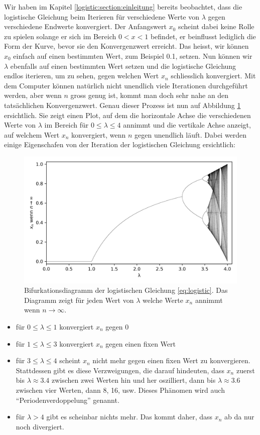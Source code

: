 Wir haben im Kapitel 
\ref{logistic:section:einleitung} 
bereits beobachtet,
dass die logistische Gleichung beim Iterieren für 
verschiedene Werte von $\lambda$ gegen verschiedene 
Endwerte konvergiert. 
Der Anfangswert $x_0$ scheint dabei keine Rolle zu spielen
solange er sich im Bereich $0 < x < 1$ befindet, 
er beinflusst lediglich die Form der Kurve, 
bevor sie den Konvergenzwert erreicht. 
Das heisst, wir können $x_0$ einfach auf einen bestimmten Wert, 
zum Beispiel 0.1, setzen. 
Nun können wir $\lambda$ ebenfalls auf einen bestimmten Wert setzen
und die logistische Gleichung endlos iterieren, 
um zu sehen, gegen welchen Wert $x_n$ schliesslich konvergiert.
Mit dem Computer können natürlich nicht unendlich viele Iterationen
durchgeführt werden, aber wenn $n$ gross genug ist, 
kommt man doch sehr nahe an den tatsächlichen Konvergenzwert. 
Genau dieser Prozess ist nun auf Abbildung \ref{fig:map_1} 
ersichtlich. 
Sie zeigt einen Plot, 
auf dem die horizontale Achse die verschiedenen Werte
von $\lambda$ im Bereich für $0 \leq \lambda \leq 4$ annimmt 
und die vertikale Achse anzeigt,
auf welchem Wert $x_n$ konvergiert, wenn $n$ gegen
unendlich läuft. Dabei werden einige Eigenschafen 
von der Iteration der logistischen Gleichung ersichtlich:
\begin{figure}
    \includegraphics[width=\linewidth]{papers/logistic/figures/map.png}
    \caption{
        Bifurkationsdiagramm der logistischen Gleichung \eqref{eq:logistic}.
        Das Diagramm zeigt für jeden Wert von $\lambda$
        welche Werte $x_n$ annimmt wenn $n \rightarrow \infty$.
    }
    \label{fig:map_1}
\end{figure}
\begin{itemize}
    \item 
    für $0 \le \lambda \le 1$ konvergiert $x_n$ gegen 0
    \item 
    für $1 \le \lambda \le 3$ konvergiert $x_n$ gegen einen fixen Wert
    \item 
    für $3 \le \lambda \le 4$ scheint $x_n$ nicht mehr gegen einen fixen Wert zu konvergieren.
    Stattdessen gibt es diese Verzweigungen, 
    die darauf hindeuten, 
    dass $x_n$ zuerst bis $\lambda \approx 3.4$ zwischen zwei Werten hin und her oszilliert, 
    dann bis $\lambda \approx 3.6$ zwischen vier Werten, dann 8, 16, usw. 
    Dieses Phänomen wird auch ``Periodenverdoppelung'' genannt.
    \item
    für $\lambda > 4$ gibt es scheinbar nichts mehr.
    Das kommt daher, dass $x_n$ ab da nur noch divergiert.  
\end{itemize}

